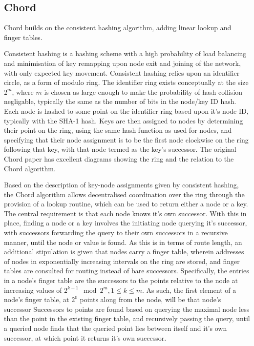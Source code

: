 \documentclass[10pt, a4paper]{article}
\begin{document}
\subsection{Chord}

Chord builds on the consistent hashing algorithm, adding linear lookup and finger tables.

Consistent hashing is a hashing scheme with a high probability of load balancing and minimisation of key remapping upon node exit and joining of the network, with only  expected key movement.
Consistent hashing relies upon an identifier circle, as a form of modulo ring.
The identifier ring exists conceptually at the size $2^m$, where $m$ is chosen as large enough to make the probability of hash collision negligable, typically the same as the number of bits in the node/key ID hash.
Each node is hashed to some point on the identifier ring based upon it's node ID, typically with the SHA-1 hash.
Keys are then assigned to nodes by determining their point on the ring, using the same hash function as used for nodes, and specifying that their node assignment is to be the first node clockwise on the ring following that key, with that node termed as the key's successor.
The original Chord paper has excellent diagrams showing the ring and the relation to the Chord algorithm.

Based on the description of key-node assignments given by consistent hashing, the Chord algorithm allows decentralised coordination over the ring through the provision of a lookup routine, which can be used to return either a node or a key.
The central requirement is that each node knows it's own successor.
With this in place, finding a node or a key involves the initiating node querying it's successor, with successors forwarding the query to their own successors in a recursive manner, until the node or value is found.
As this is  in terms of route length, an additional stipulation is given that nodes carry a finger table, wherein addresses of nodes in exponentially increasing intervals on the ring are stored, and finger tables are consulted for routing instead of bare successors.
Specifically, the entries in a node's finger table are the successors to the points relative to the node at increasing values of $2^{k-1} \mod 2^m, 1 \leq k \leq m$.
As such, the first element of a node's finger table, at $2^0$ points along from the node, will be that node's successor
Successors to points are found based on querying the maximal node less than the point in the existing finger table, and recursively passing the query, until a queried node finds that the queried point lies between itself and it's own successor, at which point it returns it's own successor.
\end{document}

